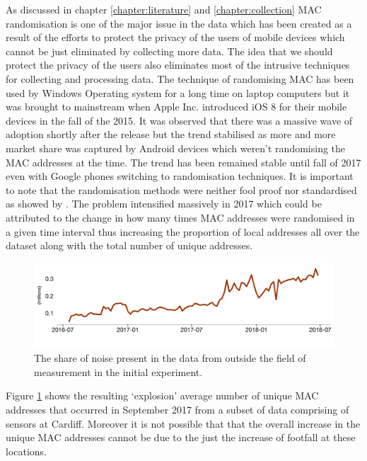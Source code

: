 As discussed in chapter \ref{chapter:literature} and \ref{chapter:collection} MAC randomisation is one of the major issue in the data which has been created as a result of the efforts to protect the privacy of the users of mobile devices which cannot be just eliminated by collecting more data.
The idea that we should protect the privacy of the users also eliminates most of the intrusive techniques for collecting and processing data.
The technique of randomising MAC has been used by Windows Operating system for a long time on laptop computers but it was brought to mainstream when Apple Inc. introduced iOS 8 for their mobile devices in the fall of the 2015.
It was observed that there was a massive wave of adoption shortly after the release but the trend stabilised as more and more market share was captured by Android devices which weren't randomising the MAC addresses at the time.
The trend has been remained stable until fall of 2017 even with Google phones switching to randomisation techniques. 
It is important to note that the randomisation methods were neither fool proof nor standardised as showed by \citep{vanhoef2016}.
The problem intensified massively in 2017 which could be attributed to the change in how many times MAC addresses were randomised in a given time interval thus increasing the proportion of local addresses all over the dataset along with the total number of unique addresses.

\begin{figure}
  \includegraphics[trim={0 0 0 0},clip]{images/processing-error-randomisation.png}
  \caption{The share of noise present in the data from outside the field of measurement in the initial experiment.}
  \label{figure:processing:error:random}
\end{figure}

Figure \ref{figure:processing:error:random} shows the resulting `explosion' average number of unique MAC addresses that occurred in September 2017 from a subset of data comprising of sensors at Cardiff.
Moreover it is not possible that that the overall increase in the unique MAC addresses cannot be due to the just the increase of footfall at these locations.

